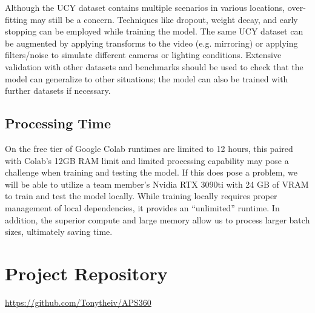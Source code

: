 \documentclass{article} %
\begin{document}
Although the UCY dataset contains multiple scenarios in various locations, over-fitting may still be a concern. Techniques like dropout, weight decay, and early stopping can be employed while training the model. The same UCY dataset can be augmented by applying transforms to the video (e.g. mirroring) or applying filters/noise to simulate different cameras or lighting conditions. Extensive validation with other datasets and benchmarks should be used to check that the model can generalize to other situations; the model can also be trained with further datasets if necessary.

\subsection{Processing Time}

On the free tier of Google Colab runtimes are limited to 12 hours, this paired with Colab's 12GB RAM limit and limited processing capability may pose a challenge when training and testing the model. If this does pose a problem, we will be able to utilize a team member's Nvidia RTX 3090ti with 24 GB of VRAM to train and test the model locally. While training locally requires proper management of local dependencies, it provides an ``unlimited'' runtime. In addition, the superior compute and large memory allow us to process larger batch sizes, ultimately saving time.


\section{Project Repository}

\url{https://github.com/Tonytheiv/APS360}

\label{last_page}



\end{document}
